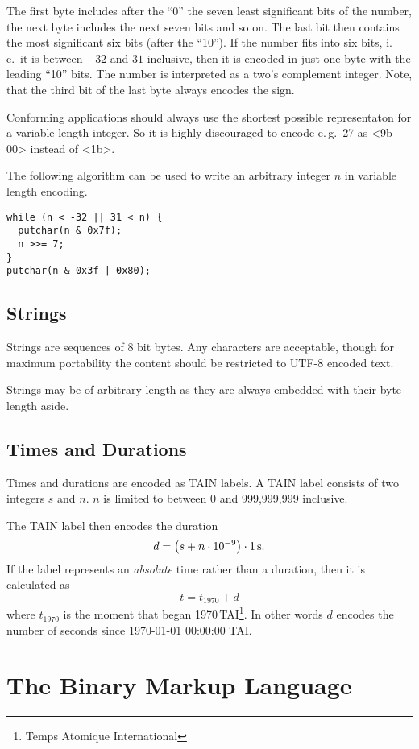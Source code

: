 \documentclass[DIV=10]{scrartcl}
\begin{document}
The first byte includes after the “0” the seven least significant bits of the number, the next byte includes the next seven bits and so on.
The last bit then contains the most significant six bits (after the “10”).
If the number fits into six bits, i.\,e.\ it is between \(-32\) and \(31\) inclusive, then it is encoded in just one byte with the leading “10” bits.
The number is interpreted as a two’s complement integer.
Note, that the third bit of the last byte always encodes the sign.

Conforming applications should always use the shortest possible representaton for a variable length integer.
So it is highly discouraged to encode e.\,g.\ 27 as <9b 00> instead of <1b>.

The following algorithm can be used to write an arbitrary integer \(n\) in variable length encoding.

\begin{verbatim}
while (n < -32 || 31 < n) {
  putchar(n & 0x7f);
  n >>= 7;
}
putchar(n & 0x3f | 0x80);
\end{verbatim}

\subsection{Strings}

Strings are sequences of 8 bit bytes.
Any characters are acceptable, though for maximum portability the content should be restricted to UTF-8 encoded text.

Strings may be of arbitrary length as they are always embedded with their byte length aside.

\subsection{Times and Durations}

Times and durations are encoded as TAIN labels.
A TAIN label consists of two integers \(s\) and \(n\).
\(n\) is limited to between 0 and 999,999,999 inclusive.

The TAIN label then encodes the duration
\[
  d = \left(s + n\cdot10^{-9}\right) \cdot 1\text{\,s}.
\]
If the label represents an \emph{absolute} time rather than a duration, then it is calculated as
\[
  t = t_{1970} + d
\]
where \(t_{1970}\) is the moment that began 1970\,TAI\footnote{Temps Atomique International}.
In other words \(d\) encodes the number of seconds since \mbox{1970-01-01} \mbox{00:00:00} TAI.

\clearpage
\section{The Binary Markup Language}
\end{document}
